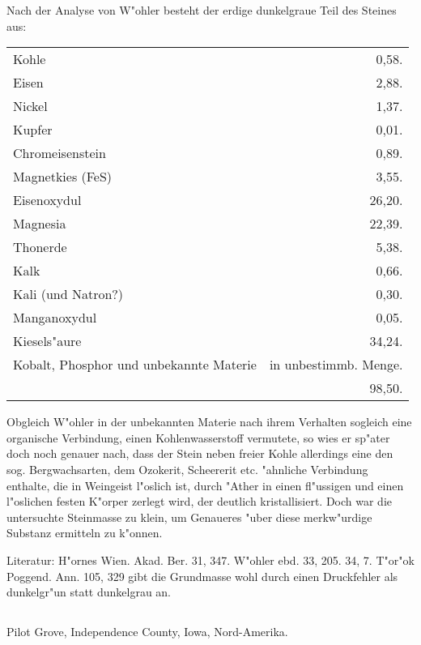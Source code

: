 \documentclass[a4paper, 11pt, oneside]{article}
\begin{document}
Nach der Analyse von W"ohler besteht der erdige dunkelgraue Teil des Steines aus:

\begin{table}[H]
    \centering\swabfamily\Large
    \begin{tabular}{l r}
        Kohle & 0,58. \\
        Eisen & 2,88. \\
        Nickel & 1,37. \\
        Kupfer & 0,01. \\
        Chromeisenstein & 0,89. \\
        Magnetkies (FeS) & 3,55. \\
        Eisenoxydul & 26,20. \\
        Magnesia & 22,39. \\
        Thonerde & 5,38. \\
        Kalk & 0,66. \\
        Kali (und Natron?)  & 0,30. \\
        Manganoxydul & 0,05. \\
        Kiesels"aure & 34,24. \\
        Kobalt, Phosphor und unbekannte Materie & in unbestimmb. Menge.  \\
         & 98,50. \\
    \end{tabular}
\end{table}

Obgleich W"ohler in der unbekannten Materie nach ihrem Verhalten sogleich eine organische Verbindung, einen Kohlenwasserstoff vermutete, so wies er sp"ater doch noch genauer nach, dass der Stein neben freier Kohle allerdings eine den sog. Bergwachsarten, dem Ozokerit, Scheererit etc. "ahnliche Verbindung enthalte, die in Weingeist l"oslich ist, durch "Ather in einen fl"ussigen und einen l"oslichen festen K"orper zerlegt wird, der deutlich kristallisiert. Doch war die untersuchte Steinmasse zu klein, um Genaueres "uber diese merkw"urdige Substanz ermitteln zu k"onnen.

\normalsize
Literatur: H"ornes Wien. Akad. Ber. 31, 347. W"ohler ebd. 33, 205. 34, 7. T"or"ok Poggend. Ann. 105, 329 gibt die Grundmasse wohl durch einen Druckfehler als dunkelgr"un statt dunkelgrau an.

\subsection{}
\LARGE
\paragraph{}
Pilot Grove, Independence County, Iowa, Nord-Amerika.
\end{document}
